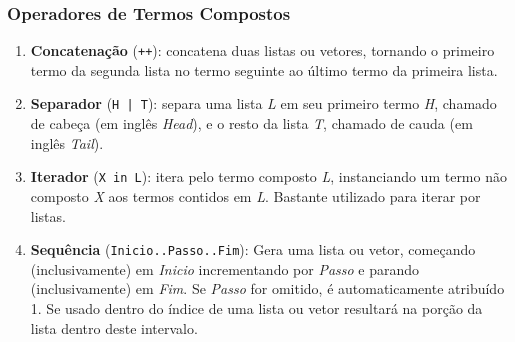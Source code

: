 \begin{frame}[fragile]
\frametitle{Operadores de Termos Compostos}
        
    \begin{block}{}
    	
    	\begin{enumerate}
        
            \item \textbf{Concatenação}\/ (\verb!++!): concatena duas listas ou vetores, tornando o primeiro termo 
            da segunda lista no termo seguinte ao último termo da primeira lista.

            \item \textbf{Separador}\/ (\verb!H | T!): separa uma lista \emph{L} em seu primeiro termo \emph{H}, 
            chamado de cabeça (em inglês \textit{Head}), e o resto da lista \emph{T}, chamado de cauda (em inglês \textit{Tail}).

            \item \textbf{Iterador}\/ (\verb!X in L!): itera pelo termo composto \emph{L}, instanciando um termo
            não composto \emph{X} aos termos contidos em \emph{L}. Bastante utilizado para iterar por listas.
            \item \textbf{Sequência }\/ (\verb!Inicio..Passo..Fim!): Gera uma lista ou vetor, começando 
            (inclusivamente) em \textit{Inicio} incrementando por \textit{Passo} e parando (inclusivamente) em 
            \textit{Fim}. Se \textit{Passo} for omitido, é automaticamente atribuído 1. Se usado dentro do 
            índice de uma lista ou vetor resultará na porção da lista dentro deste intervalo.
            
    	\end{enumerate}
        
    \end{block}
    
\end{frame}

